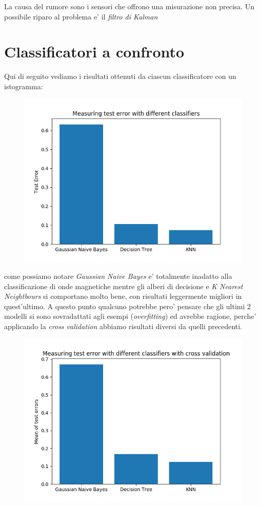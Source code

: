La causa del rumore sono i sensori che offrono una misurazione non precisa. Un possibile riparo al problema e' il \textit{filtro di Kalman}

\section{Classificatori a confronto}
Qui di seguito vediamo i risultati ottenuti da ciascun classificatore con un istogramma:

\begin{figure}[H]
	\centering
	\includegraphics[width=0.7\linewidth]{img/test_errors}
	\caption{}
	\label{fig:testerrors}
\end{figure}

come possiamo notare \textit{Gaussian Naive Bayes} e' totalmente inadatto alla classificazione di onde magnetiche mentre gli alberi di decisione e \textit{K Nearest Neightbours} si comportano molto bene, con risultati leggermente migliori in quest'ultimo.
A questo punto qualcuno potrebbe pero' pensare che gli ultimi 2 modelli si sono sovradattati agli esempi (\textit{overfitting}) ed avrebbe ragione, perche' applicando la \textit{cross validation} abbiamo risultati diversi da quelli precedenti.

\begin{figure}[H]
	\centering
	\includegraphics[width=0.7\linewidth]{img/test_errors_cross_validation}
	\caption{}
	\label{fig:testerrorscrossvalidation}
\end{figure}

